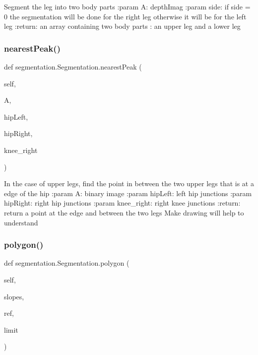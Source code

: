 \begin{DoxyVerb}Segment the leg into two body parts
:param A: depthImag
:param side: if side = 0 the segmentation will be done for the right leg
  otherwise it will be for the left leg
:return: an array containing two body parts : an upper leg and a lower leg
\end{DoxyVerb}
 \mbox{\label{classsegmentation_1_1_segmentation_a887e7665b0fc07dfb964223ef50dc295}} 
\subsubsection{\texorpdfstring{nearest\+Peak()}{nearestPeak()}}
{\footnotesize\ttfamily def segmentation.\+Segmentation.\+nearest\+Peak (\begin{DoxyParamCaption}\item[{}]{self,  }\item[{}]{A,  }\item[{}]{hip\+Left,  }\item[{}]{hip\+Right,  }\item[{}]{knee\+\_\+right }\end{DoxyParamCaption})}

\begin{DoxyVerb}In the case of upper legs, find the point in between the two upper legs that is at a edge of the hip
:param A: binary image
:param hipLeft: left hip junctions
:param hipRight:  right hip junctions
:param knee_right: right knee junctions
:return: return a point at the edge and between the two legs
Make drawing will help to understand
\end{DoxyVerb}
 \mbox{\label{classsegmentation_1_1_segmentation_abbd3c1929edf660b23d908a99e2775ab}} 
\subsubsection{\texorpdfstring{polygon()}{polygon()}}
{\footnotesize\ttfamily def segmentation.\+Segmentation.\+polygon (\begin{DoxyParamCaption}\item[{}]{self,  }\item[{}]{slopes,  }\item[{}]{ref,  }\item[{}]{limit }\end{DoxyParamCaption})}

